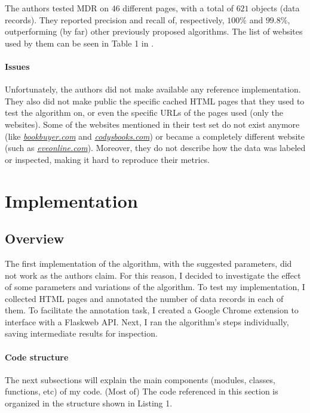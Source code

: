 \documentclass[10pt]{article}
\begin{document}
The authors tested MDR on $46$ different pages, with a total of $621$ objects (data records). They reported precision and recall of, respectively, $100\%$ and $99.8\%$, outperforming (by far) other previously proposed algorithms. The list of websites used by them can be seen in Table 1 in \cite{mdr}. 

\paragraph{Issues}

Unfortunately, the authors did not make available any reference implementation. They also did not make public the specific cached HTML pages that they used to test the algorithm on, or even the specific URLs of the pages used (only the websites). Some of the websites mentioned in their test set do not exist anymore (like \href{http://www.bookbuyer.com}{\textit{bookbuyer.com}} and \href{http://www.codysbooks.com}{\textit{codysbooks.com}}) or became a completely different website (such as \href{https://www.eveonline.com/}{\textit{eveonline.com}}). Moreover, they do not describe how the data was labeled or inspected, making it hard to reproduce their metrics.



\section{Implementation} \label{txt:implementation}

\subsection{Overview}

The first implementation of the algorithm, with the suggested parameters, did not work as the authors claim. For this reason, I decided to investigate the effect of some parameters and variations of the algorithm. To test my implementation, I collected HTML pages and annotated the number of data records in each of them. To facilitate the annotation task, I created a Google Chrome extension to interface with a Flask\footnotemark web API. Next, I ran the algorithm's steps individually, saving intermediate results for inspection.


\paragraph{Code structure} The next subsections will explain the main components (modules, classes, functions, etc) of my code. (Most of) The code referenced in this section is organized in the structure shown in Listing 1.
\end{document}
